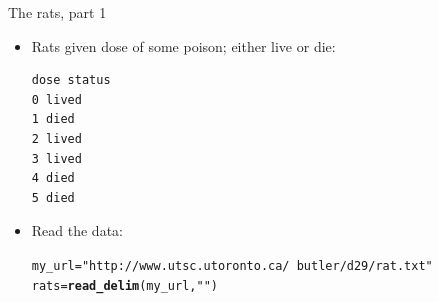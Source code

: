 \documentclass[unknownkeysallowed]{beamer}\usepackage[]{graphicx}\usepackage[]{color}
\makeatletter
\newcommand{\hlstr}[1]{\textcolor[rgb]{0.192,0.494,0.8}{#1}}%
\newcommand{\hlstd}[1]{\textcolor[rgb]{0.345,0.345,0.345}{#1}}%
\newcommand{\hlkwb}[1]{\textcolor[rgb]{0.69,0.353,0.396}{#1}}%
\newcommand{\hlkwd}[1]{\textcolor[rgb]{0.737,0.353,0.396}{\textbf{#1}}}%
\newenvironment{kframe}{%
 \def\at@end@of@kframe{}%
 \ifinner\ifhmode%
  \def\at@end@of@kframe{\end{minipage}}%
  \begin{minipage}{\columnwidth}%
 \fi\fi%
 \def\FrameCommand##1{\hskip\@totalleftmargin \hskip-\fboxsep
 \colorbox{shadecolor}{##1}\hskip-\fboxsep
     \hskip-\linewidth \hskip-\@totalleftmargin \hskip\columnwidth}%
 \MakeFramed {\advance\hsize-\width
   \@totalleftmargin\z@ \linewidth\hsize
   \@setminipage}}%
 {\par\unskip\endMakeFramed%
 \at@end@of@kframe}
\newenvironment{knitrout}{}{} %
\makeatother
\begin{document}
\begin{frame}[fragile]{The rats, part 1}

  \begin{itemize}
  \item Rats given dose of some poison; either live or die:

    \begin{small}
\begin{verbatim}
dose status
0 lived
1 died
2 lived
3 lived
4 died
5 died
\end{verbatim}
      
    \end{small}

  \item Read the data:

 
\begin{knitrout}\small
{}\color{fgcolor}\begin{kframe}
\begin{alltt}
\hlstd{my_url}\hlkwb{=}\hlstr{"http://www.utsc.utoronto.ca/~butler/d29/rat.txt"}
\hlstd{rats}\hlkwb{=}\hlkwd{read_delim}\hlstd{(my_url,}\hlstr{" "}\hlstd{)}
\end{alltt}


{\ttfamily\noindent\itshape\color{messagecolor}{\#\# Parsed with column specification:\\\#\# cols(\\\#\#\ \  dose = col\_double(),\\\#\#\ \  status = col\_character()\\\#\# )}}\end{kframe}
\end{knitrout}
  

  \end{itemize}
  



\end{frame}
  
\end{document}
